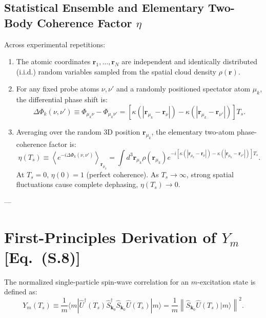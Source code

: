 \documentclass[11pt,a4paper]{article}
\begin{document}
\subsection{Statistical Ensemble and Elementary Two-Body Coherence Factor $\eta$}
Across experimental repetitions:
\begin{enumerate}
    \item The atomic coordinates $\mathbf{r}_1, \dots, \mathbf{r}_N$ are independent and identically distributed (i.i.d.) random variables sampled from the spatial cloud density $\rho(\mathbf{r})$.
    \item For any fixed probe atoms $\nu, \nu'$ and a randomly positioned spectator atom $\mu_k$, the differential phase shift is:
    \begin{equation}
        \Delta \Phi_k(\nu, \nu') \equiv \Phi_{\mu_k \nu} - \Phi_{\mu_k \nu'} = \left[ \kappa(|\mathbf{r}_{\mu_k} - \mathbf{r}_\nu|) - \kappa(|\mathbf{r}_{\mu_k} - \mathbf{r}_{\nu'}|) \right] T_s.
    \end{equation}
    \item Averaging over the random 3D position $\mathbf{r}_{\mu_k}$, the elementary two-atom phase-coherence factor is:
    \begin{equation}
        \eta(T_s) \equiv \left\langle e^{-i \Delta \Phi_k(\nu, \nu')} \right\rangle_{\mathbf{r}_{\mu_k}} = \int d^3 \mathbf{r}_{\mu_k} \rho(\mathbf{r}_{\mu_k}) e^{-i \left[ \kappa(|\mathbf{r}_{\mu_k} - \mathbf{r}_\nu|) - \kappa(|\mathbf{r}_{\mu_k} - \mathbf{r}_{\nu'}|) \right] T_s}.
        \label{eq:eta_def}
    \end{equation}
    At $T_s = 0$, $\eta(0) = 1$ (perfect coherence). As $T_s \to \infty$, strong spatial fluctuations cause complete dephasing, $\eta(T_s) \to 0$.
\end{enumerate}

---

\section{First-Principles Derivation of $Y_m$ [Eq.~(S.8)]}

The normalized single-particle spin-wave correlation for an $m$-excitation state is defined as:
\begin{equation}
    Y_m(T_s) \equiv \frac{1}{m} \langle m | \hat{U}^\dagger(T_s) \hat{S}_{\mathbf{k}_0}^\dagger \hat{S}_{\mathbf{k}_0} \hat{U}(T_s) | m \rangle = \frac{1}{m} \left\| \hat{S}_{\mathbf{k}_0} \hat{U}(T_s) | m \rangle \right\|^2.
    \label{eq:Ym_def}
\end{equation}
\end{document}
